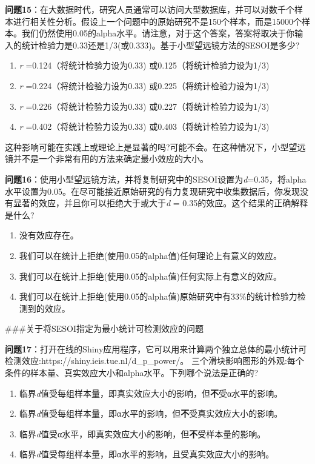 \documentclass[
  letterpaper,
  DIV=11,
  numbers=noendperiod]{scrreprt}
\providecommand{\tightlist}{%
  \setlength{\itemsep}{0pt}\setlength{\parskip}{0pt}}\usepackage{longtable,booktabs,array}
\begin{document}
\textbf{问题15}：在大数据时代，研究人员通常可以访问大型数据库，并可以对数千个样本进行相关性分析。假设上一个问题中的原始研究不是150个样本，而是15000个样本。我们仍然使用0.05的alpha水平。请注意，对于这个答案，答案将取决于你输入的统计检验力是0.33还是1/3(或0.333)。基于小型望远镜方法的SESOI是多少?

\begin{enumerate}
\def\labelenumi{\Alph{enumi})}
\tightlist
\item
  \emph{r} =0.124（将统计检验力设为0.33) 或0.125（将统计检验力设为1/3)
\item
  \emph{r} =0.224（将统计检验力设为0.33) 或0.225（将统计检验力设为1/3)
\item
  \emph{r} =0.226（将统计检验力设为0.33) 或0.227（将统计检验力设为1/3)
\item
  \emph{r} =0.402（将统计检验力设为0.33) 或0.403（将统计检验力设为1/3)
\end{enumerate}

这种影响可能在实践上或理论上是显著的吗?可能不会。在这种情况下，小型望远镜并不是一个非常有用的方法来确定最小效应的大小。

\textbf{问题16}：使用小型望远镜方法，并将复制研究中的SESOI设置为\emph{d}=0.35，将alpha水平设置为0.05。在尽可能接近原始研究的有力复现研究中收集数据后，你发现没有显著的效应，并且你可以拒绝大于或大于\emph{d}
= 0.35的效应。这个结果的正确解释是什么?

\begin{enumerate}
\def\labelenumi{\Alph{enumi})}
\tightlist
\item
  没有效应存在。
\item
  我们可以在统计上拒绝(使用0.05的alpha值)任何理论上有意义的效应。
\item
  我们可以在统计上拒绝(使用0.05的alpha值)任何实际上有意义的效应。
\item
  我们可以在统计上拒绝(使用0.05的alpha值)原始研究中有33\%的统计检验力检测到的效应。
\end{enumerate}

\#\#\#关于将SESOI指定为最小统计可检测效应的问题

\textbf{问题17}：打开在线的Shiny应用程序，它可以用来计算两个独立总体的最小统计可检测效应:https://shiny.ieis.tue.nl/d\_p\_power/。
三个滑块影响图形的外观:每个条件的样本量、真实效应大小和alpha水平。下列哪个说法是正确的?

\begin{enumerate}
\def\labelenumi{\Alph{enumi})}
\tightlist
\item
  临界\emph{d}值受每组样本量，即真实效应大小的影响，但\textbf{不}受α水平的影响。
\item
  临界\emph{d}值受每组样本量，即α水平的影响，但\textbf{不}受真实效应大小的影响。
\item
  临界\emph{d}值受α水平，即真实效应大小的影响，但\textbf{不}受样本量的影响。
\item
  临界\emph{d}值受每组样本量，即α水平的影响，且受真实效应大小的影响。
\end{enumerate}
\end{document}
